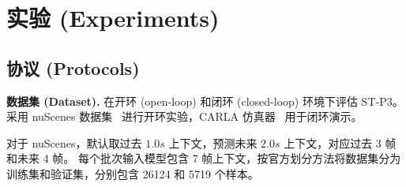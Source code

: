 \begin{table}[]
\centering
\caption{深度图评估 (Depth map evaluation). ARE：绝对相对误差 (absolute relative error)；SRE：平方相对误差 (square relative error)；RMSE：均方根误差 (root mean square error)；RMSE log：均方根对数误差 (root mean square logarithmic error)；$\delta$：精度 (accuracy, 阈值 1.25)}
\label{tab:depth_map_eval}
\end{table}




\section{实验 (Experiments)}
\subsection{协议 (Protocols)}
\indent\textbf{数据集 (Dataset).}
在开环 (open-loop) 和闭环 (closed-loop) 环境下评估 ST-P3。%
%
采用 nuScenes 数据集~\cite{caesar2020nuscenes} 进行开环实验，CARLA 仿真器~\cite{dosovitskiy2017carla} 用于闭环演示。

对于 nuScenes，默认取过去 $1.0s$ 上下文，预测未来 $2.0s$ 上下文，对应过去 3 帧和未来 4 帧。
%
每个批次输入模型包含 7 帧上下文，按官方划分方法将数据集分为训练集和验证集，分别包含 26124 和 5719 个样本。

